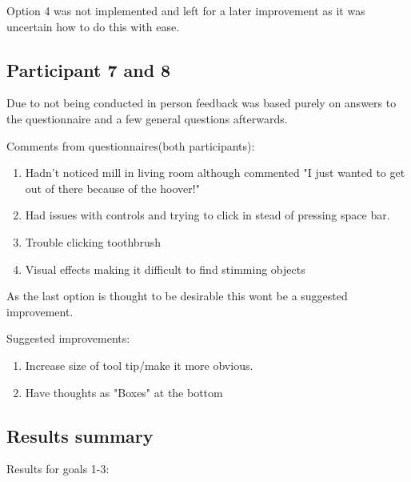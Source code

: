 Option 4 was not implemented and left for a later improvement as it was uncertain how to do this with ease. 

\subsection*{Participant 7 and 8}
Due to not being conducted in person feedback was based purely on answers to the questionnaire and a few general questions afterwards. 

Comments from questionnaires(both participants):
\begin{enumerate}
\item Hadn't noticed mill in living room although commented "I just wanted to get out of there because of the hoover!"
\item Had issues with controls and trying to click in stead of pressing space bar.
\item Trouble clicking toothbrush
\item Visual effects making it difficult to find stimming objects
\end{enumerate}

As the last option is thought to be desirable this wont be a suggested improvement. 

Suggested improvements:
\begin{enumerate}
\item Increase size of tool tip/make it more obvious.
\item Have thoughts as "Boxes" at the bottom
\end{enumerate}

\subsection*{Results summary}
Results for goals 1-3:

